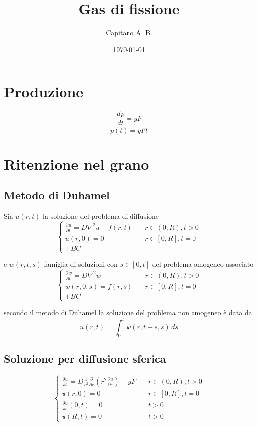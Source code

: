 \documentclass{article}
\title{Gas di fissione}
\author{Capitano A. B.}
\date{\today}
\newcommand{\deriv}[3][]{\frac{d^{#1} #2}{d #3^{#1}}}
\newcommand{\pderiv}[3][]{\frac{\partial^{#1} #2}{\partial #3^{#1}}}
\begin{document}
\maketitle

\section{Produzione}
\[
  \deriv{p}{t} = y\dot{F}
\]
\[
  p(t) = y\dot{F}t
\]

\section{Ritenzione nel grano}

\subsection{Metodo di Duhamel}
Sia \(u(r,t)\) la soluzione del problema di diffusione
$$\[
  \begin{cases}
    \pderiv{u}{t} = D \nabla^2 u + f(r,t)  \quad & r \in (0, R), t > 0 \\
    u(r,0) = 0 \quad & r \in [0, R], t = 0 \\
    + BC
  \end{cases}
\]

e \(w(r,t,s)\) famiglia di soluzioni con \(s \in [0,t]\) del problema omogeneo associato
\[
  \begin{cases}
    \pderiv{w}{t} = D \nabla^2 w  \quad & r \in (0, R), t > 0 \\
    w(r,0,s) = f(r,s) \quad & r \in [0, R], t = 0 \\
    + BC
  \end{cases} 
\]

secondo il metodo di Duhamel la soluzione del problema non omogeneo è data da
\[
  u(r,t) = \int_0^t w(r,t-s,s) \, ds
\]
\subsection{Soluzione per diffusione sferica}
\[
\begin{cases}
  \pderiv{u}{t} = D \frac{1}{r^2}\pderiv{}{r}( r^2 \pderiv{u}{r} ) + y\dot{F}  \quad & r \in (0, R), t > 0 \\
  u(r,0) = 0 \quad & r \in [0, R], t = 0 \\
  \pderiv{u}{r}(0,t) = 0 \quad & t > 0\\
  u(R, t) = 0 \quad & t > 0
\end{cases}
\]
\end{document}
